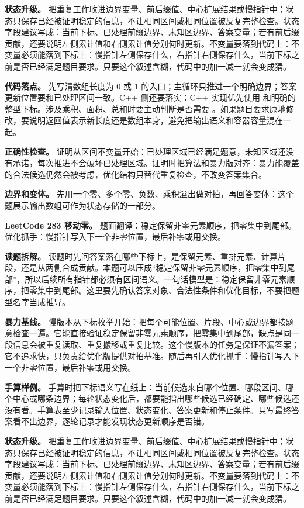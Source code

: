 \textbf{状态升级。} 把重复工作收进边界变量、前后缀值、中心扩展结果或慢指针中；状态只保存已经被证明稳定的信息，不让相同区间或相同位置被反复完整检查。状态字段建议写成：当前下标、已处理前缀边界、未知区边界、答案变量；若有前后缀贡献，还要说明左侧累计值和右侧累计值分别何时更新。不变量要落到代码上：不变量必须能落到下标上：慢指针左侧保存什么，右指针右侧保存什么，当前下标之前是否已经满足题目要求。只要这个叙述含糊，代码中的加一减一就会变成猜。

\textbf{代码落点。} 先写清数组长度为 0 或 1 的入口；主循环只推进一个明确边界；答案更新位置要和已处理区间一致。C++ 侧还要落实：C++ 实现优先使用  和明确的整型下标。涉及乘积、面积、总和时要主动判断是否需要 。如果题目要求原地修改，要说明返回值表示新长度还是数组本身，避免把输出语义和容器容量混在一起。

\textbf{正确性检查。} 证明从区间不变量开始：已处理区域已经满足题意，未知区域还没有承诺，每次推进不会破坏已处理区域。证明时把算法和暴力版对齐：暴力能覆盖的合法候选仍然会被考虑，优化结构只替代重复检查，不改变答案集合。

\textbf{边界和变体。} 先用一个零、多个零、负数、乘积溢出做对拍，再回答变体：这个题展示输出数组可作为状态存储的一部分。

\noindent\textbf{LeetCode 283 移动零。} 题面翻译：稳定保留非零元素顺序，把零集中到尾部。优化抓手：慢指针写入下一个非零位置，最后补零或用交换。

\textbf{读题拆解。} 读题时先问答案落在哪些下标上，是保留元素、重排元素、计算片段，还是从两侧合成贡献。本题可以压成“稳定保留非零元素顺序，把零集中到尾部”，所以后续所有指针都必须有区间语义。一句话模型是：稳定保留非零元素顺序，把零集中到尾部。这里要先确认答案对象、合法性条件和优化目标，不要把题型名字当成推导。

\textbf{暴力基线。} 慢版本从下标枚举开始：把每个可能位置、片段、中心或边界都按题意检查一遍。它能直接验证稳定保留非零元素顺序，把零集中到尾部，缺点是同一段信息会被重复读取、重复搬移或重复比较。这个慢版本的任务是保证不漏答案；它不追求快，只负责给优化版提供对拍基准。随后再引入优化抓手：慢指针写入下一个非零位置，最后补零或用交换。

\textbf{手算样例。} 手算时把下标语义写在纸上：当前候选来自哪个位置、哪段区间、哪个中心或哪条边界；每轮状态变化后，都要能指出哪些候选已经确定、哪些候选还没有看。手算表至少记录输入位置、状态变化、答案更新和停止条件。只写最终答案看不出边界，逐轮记录才能发现状态更新顺序是否错。

\textbf{状态升级。} 把重复工作收进边界变量、前后缀值、中心扩展结果或慢指针中；状态只保存已经被证明稳定的信息，不让相同区间或相同位置被反复完整检查。状态字段建议写成：当前下标、已处理前缀边界、未知区边界、答案变量；若有前后缀贡献，还要说明左侧累计值和右侧累计值分别何时更新。不变量要落到代码上：不变量必须能落到下标上：慢指针左侧保存什么，右指针右侧保存什么，当前下标之前是否已经满足题目要求。只要这个叙述含糊，代码中的加一减一就会变成猜。

